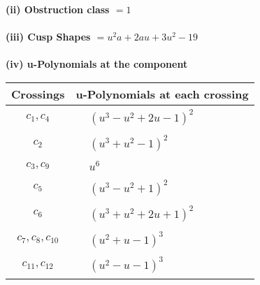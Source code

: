 \documentclass[1p]{elsarticle_modified}
\theoremstyle{definition}
\begin{document}
\flushleft \textbf{(ii) Obstruction class $= 1$}\\~\\
\flushleft \textbf{(iii) Cusp Shapes $= u^2 a+2 a u+3 u^2-19$}\\~\\
\newpage\renewcommand{\arraystretch}{1}
\flushleft \textbf{(iv) u-Polynomials at the component}\newline \\
\begin{tabular}{m{50pt}|m{274pt}}
Crossings & \hspace{64pt}u-Polynomials at each crossing \\
\hline $$\begin{aligned}c_{1},c_{4}\end{aligned}$$&$\begin{aligned}
&(u^3- u^2+2 u-1)^2
\end{aligned}$\\
\hline $$\begin{aligned}c_{2}\end{aligned}$$&$\begin{aligned}
&(u^3+u^2-1)^2
\end{aligned}$\\
\hline $$\begin{aligned}c_{3},c_{9}\end{aligned}$$&$\begin{aligned}
&u^6
\end{aligned}$\\
\hline $$\begin{aligned}c_{5}\end{aligned}$$&$\begin{aligned}
&(u^3- u^2+1)^2
\end{aligned}$\\
\hline $$\begin{aligned}c_{6}\end{aligned}$$&$\begin{aligned}
&(u^3+u^2+2 u+1)^2
\end{aligned}$\\
\hline $$\begin{aligned}c_{7},c_{8},c_{10}\end{aligned}$$&$\begin{aligned}
&(u^2+u-1)^3
\end{aligned}$\\
\hline $$\begin{aligned}c_{11},c_{12}\end{aligned}$$&$\begin{aligned}
&(u^2- u-1)^3
\end{aligned}$\\
\hline
\end{tabular}\\~\\
\end{document}
